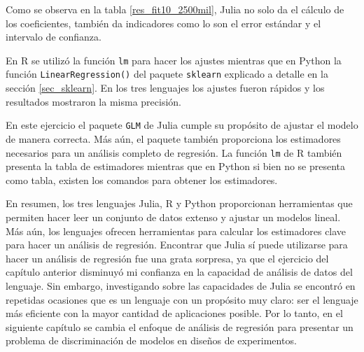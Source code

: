Como se observa en la tabla \ref{res_fit10_2500mil}, \textsf{Julia} no solo da el cálculo de los coeficientes, también da indicadores como lo son el error estándar y el intervalo de confianza. 

En \textsf{R} se utilizó la función \texttt{lm} para hacer los ajustes mientras que en \textsf{Python} la función \texttt{LinearRegression()} del paquete \texttt{sklearn} explicado a detalle en la sección \ref{sec_sklearn}. En los tres lenguajes los ajustes fueron rápidos  y los resultados mostraron la misma precisión. 

En este ejercicio el paquete \texttt{GLM} de \textsf{Julia} cumple su propósito de ajustar el modelo de manera correcta. Más aún, el paquete también proporciona los estimadores necesarios para un análisis completo de regresión. La función \texttt{lm} de \textsf{R} también presenta la tabla de estimadores mientras que en \textsf{Python} si bien no se presenta como tabla, existen los comandos para obtener los estimadores. 

En resumen, los tres lenguajes \textsf{Julia, R} y \textsf{Python} proporcionan herramientas que permiten hacer leer un conjunto de datos extenso y ajustar un modelos lineal. Más aún, los lenguajes ofrecen herramientas para calcular los estimadores clave para hacer un análisis de regresión. Encontrar que \textsf{Julia} sí puede utilizarse para hacer un análisis de regresión fue una grata sorpresa, ya que el ejercicio del capítulo anterior disminuyó mi confianza en la capacidad de análisis de datos del lenguaje. Sin embargo, investigando sobre las capacidades de \textsf{Julia} se encontró en repetidas ocasiones que es un lenguaje con un propósito muy claro: ser  el lenguaje más eficiente con la mayor cantidad de aplicaciones posible. Por lo tanto, en el siguiente capítulo se cambia el enfoque de análisis de regresión para presentar un problema de discriminación de modelos en diseños de experimentos. 



